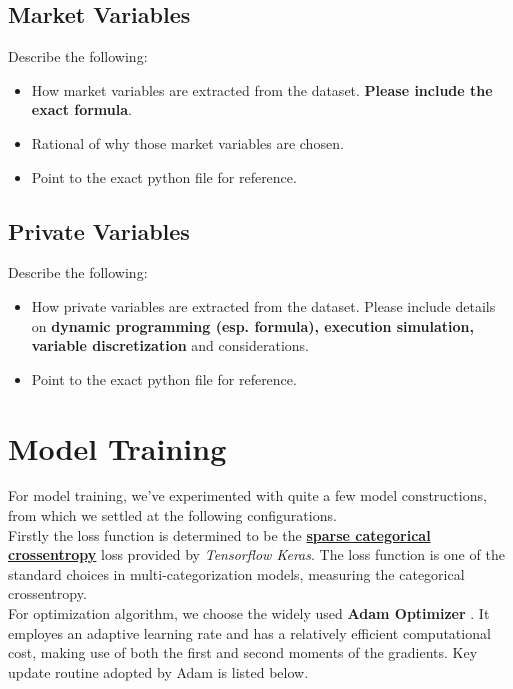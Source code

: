 \documentclass[12pt]{extarticle}
\begin{document}
\subsection{Market Variables} \label{market-variables}

Describe the following:
\begin{itemize}
  \item How market variables are extracted from the dataset. \textbf{Please include the exact formula}.
  \item Rational of why those market variables are chosen.
  \item Point to the exact python file for reference.
\end{itemize}

\subsection{Private Variables} \label{private-variables}

Describe the following:
\begin{itemize}
  \item How private variables are extracted from the dataset. Please include details on
  \textbf{dynamic programming (esp. formula), execution simulation, variable discretization} and considerations.
  \item Point to the exact python file for reference.
\end{itemize}

\section{Model Training}
For model training, we've experimented with quite a few model constructions, from which
we settled at the following configurations.\\


\noindent Firstly the loss function is determined to be the
\href{https://github.com/tensorflow/tensorflow/blob/r1.13/tensorflow/python/keras/backend.py}{\textbf{sparse categorical crossentropy}}
loss provided by \textit{Tensorflow Keras}. The loss function is one of the standard
choices in multi-categorization models, measuring the categorical crossentropy. \\


\noindent For optimization algorithm, we choose the widely used \textbf{Adam Optimizer} \cite{adam}.
It employes an adaptive learning rate and has a relatively efficient computational cost,
making use of both the first and second moments of the gradients. Key update routine
adopted by Adam is listed below.
\end{document}

